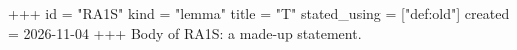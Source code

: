 +++
id = "RA1S"
kind = "lemma"
title = "T"
stated_using = ["def:old"]
created = 2026-11-04
+++
Body of RA1S: a made-up statement.
